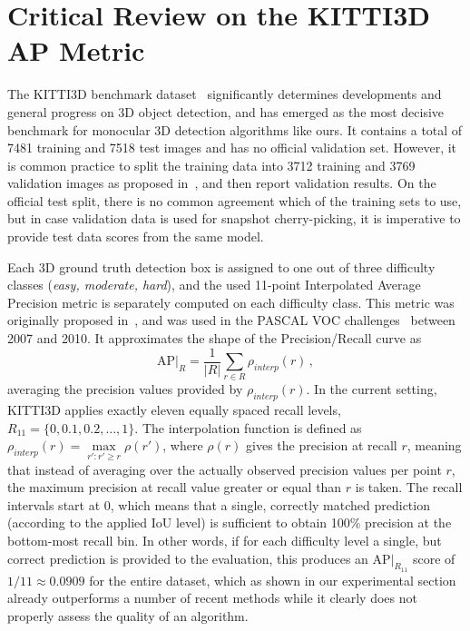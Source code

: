 \documentclass[10pt,twocolumn,letterpaper]{article}
\begin{document}
\section{Critical Review on the KITTI3D AP Metric}
\label{sec:metric}

The KITTI3D benchmark dataset~\cite{Geiger2012CVPR} significantly determines developments and general progress on 3D object detection, and has emerged as the most decisive benchmark for monocular 3D detection algorithms like ours. It contains a total of 7481 training and 7518 test images and has no official validation set. However, it is common practice to split the training data into 3712 training and 3769 validation images as proposed in~\cite{NIPS2015_Chen}, and then report validation results. On the official test split, there is no common agreement which of the training sets to use, but in case validation data is used for snapshot cherry-picking, it is imperative to provide test data scores from the same model. 

Each 3D ground truth detection box is assigned to one out of three difficulty classes (\textit{easy, moderate, hard}), and the used 11-point Interpolated Average Precision metric is separately computed on each difficulty class. This metric was originally proposed in~\cite{Salton1986}, and was used in the PASCAL VOC challenges~\cite{Everingham2010} between 2007 and 2010. It approximates the shape of the Precision/Recall curve as
\[
	\text{AP}|_R=\frac{1}{|R|}\sum_{r\in R} \rho_{interp}(r) \,,
\]
averaging the precision values provided by $\rho_{interp}(r)$. In the current setting, KITTI3D applies exactly eleven equally spaced recall levels, \ie $R_{11}=\{0, 0.1, 0.2, \ldots, 1\}$. The interpolation function is defined as $\rho_{interp}(r)=\max\limits_{r':r'\geq r} \rho(r')$, where $\rho(r)$ gives the precision at recall $r$, meaning that instead of averaging over the actually observed precision values per point $r$, the maximum precision at recall value greater or equal than $r$ is taken. The recall intervals start at $0$, which means that a single, correctly matched prediction (according to the applied IoU level) is sufficient to obtain 100\% precision at the bottom-most recall bin. In other words, if for each difficulty level a single, but correct prediction is provided to the evaluation, this produces an $\text{AP}|_{R_{11}}$ score of $1/11\approx0.0909$ for the entire dataset, which as shown in our experimental section already outperforms a number of recent methods while it clearly does not properly assess the quality of an algorithm.
\end{document}
